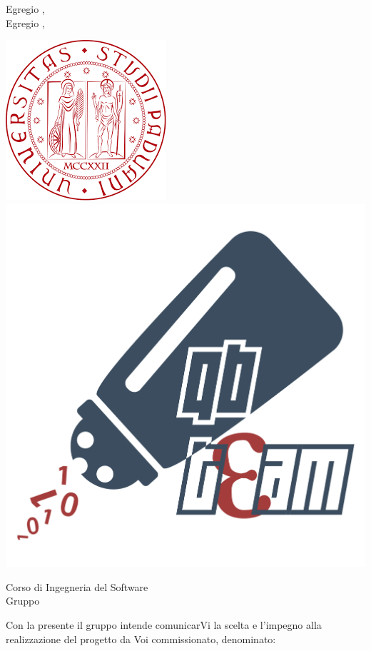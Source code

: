 \documentclass[12pt]{letter}
\begin{document}
    \begin{letter}
        { Egregio \VT{},\\Egregio \CR{},}
        \begin{center}
            \includegraphics[scale=0.5]{../Utilita/Immagini/LogoUniPD.png}
            \includegraphics[scale=0.095]{../Utilita/Immagini/qbteam.png}
        \end{center}
        {
            Corso di Ingegneria del Software\\ Gruppo \Gruppo{}
        }
        \opening{ Con la presente il gruppo \Gruppo{} intende comunicarVi la scelta e l'impegno alla realizzazione del progetto da Voi commissionato, denominato:}
        \begin{center}
            \NomeProgetto{}

\end{center}
\end{letter}
\end{document}

